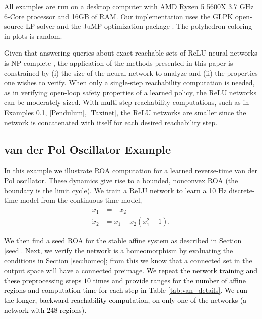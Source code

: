 All examples are run on a desktop computer with AMD Ryzen 5 5600X 3.7 GHz 6-Core processor and 16GB of RAM.
Our implementation uses the GLPK open-source LP solver and the JuMP optimization package \cite{DunningHuchetteLubin2017}. 
The polyhedron coloring in plots is random.


Given that answering queries about exact reachable sets of ReLU neural networks is NP-complete \cite{reluplex}, the application of the methods presented in this paper is constrained by (i) the size of the neural network to analyze and (ii) the properties one wishes to verify.
When only a single-step reachability computation is needed, as in verifying open-loop safety properties of a learned policy, the ReLU networks can be moderately sized.
With multi-step reachability computations, such as in Examples \ref{sec:vanderpol}, \ref{Pendulum}, \ref{Taxinet}, the ReLU networks are smaller since the network is concatenated with itself for each desired reachability step.

\subsection{van der Pol Oscillator Example} \label{sec:vanderpol}
In this example we illustrate ROA computation for a learned reverse-time van der Pol oscillator.
These dynamics give rise to a bounded, nonconvex ROA (the boundary is the limit cycle). 
We train a ReLU network to learn a 10 Hz discrete-time model from the continuous-time model,
\begin{subequations}
\begin{align}
    \dot{x}_1 &= -x_2 \\
    \dot{x}_2 &= x_1 + x_2(x_1^2 - 1).
\end{align}
\end{subequations}

We then find a seed ROA for the stable affine system as described in Section \ref{seed}. Next, we verify the network is a homeomorphism by evaluating the conditions in Section \ref{sec:homeo}; from this we know that a connected set in the output space will have a connected preimage. 
\textcolor{black}{We repeat the network training and these preprocessing steps $10$ times and provide ranges for the number of affine regions and computation time for each step in Table \ref{tab:van_details}.
We run the longer, backward reachability computation, on only one of the networks (a network with 248 regions).}

